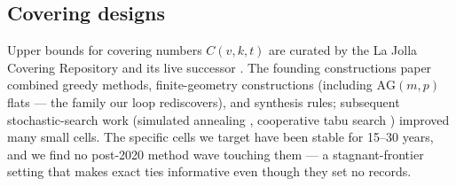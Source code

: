 \subsection{Covering designs}

Upper bounds for covering numbers $C(v,k,t)$ are curated by the La
Jolla Covering Repository and its live successor \cite{ljcr}. The
founding constructions paper \cite{gordon1995new} combined greedy
methods, finite-geometry constructions (including $\mathrm{AG}(m,p)$
flats --- the family our loop rediscovers), and synthesis rules;
subsequent stochastic-search work (simulated annealing
\cite{nurmela1993upper}, cooperative tabu search
\cite{dai2006cooperative}) improved many small cells. The specific
cells we target have been stable for 15--30 years, and we find no
post-2020 method wave touching them --- a stagnant-frontier setting
that makes exact ties informative even though they set no records.
